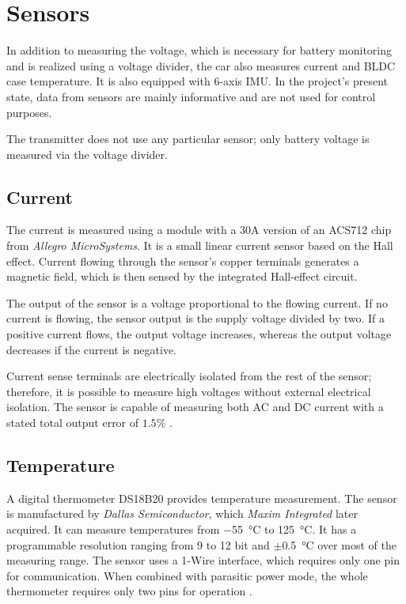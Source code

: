 \section{Sensors}
\label{hw_sensors}
In addition to measuring the voltage, which is necessary for battery monitoring and is realized using a voltage divider, the car also measures current and BLDC case temperature. It is also equipped with 6-axis IMU. In the project's present state, data from sensors are mainly informative and are not used for control purposes.

The transmitter does not use any particular sensor; only battery voltage is measured via the voltage divider.

\subsection{Current}		%
The current is measured using a module with a 30A version of an ACS712 chip from \textit{Allegro MicroSystems}. It is a small linear current sensor based on the Hall effect. Current flowing through the sensor's copper terminals generates a magnetic field, which is then sensed by the integrated Hall-effect circuit.

The output of the sensor is a voltage proportional to the flowing current. If no current is flowing, the sensor output is the supply voltage divided by two. If a positive current flows, the output voltage increases, whereas the output voltage decreases if the current is negative.

Current sense terminals are electrically isolated from the rest of the sensor; therefore, it is possible to measure high voltages without external electrical isolation. The sensor is capable of measuring both AC and DC current with a stated total output error of $1.5\%$ \cite{acs_datasheet}. 

\subsection{Temperature}	%
A digital thermometer DS18B20 provides temperature measurement. The sensor is manufactured by \textit{Dallas Semiconductor}, which \textit{Maxim Integrated} later acquired. It can measure temperatures from \SI{-55}{\degreeCelsius} to \SI{125}{\degreeCelsius}. It has a programmable resolution ranging from 9 to 12 bit and $\pm$\SI{0.5}{\degreeCelsius} over most of the measuring range. The sensor uses a 1-Wire interface, which requires only one pin for communication. When combined with parasitic power mode, the whole thermometer requires only two pins for operation \cite{ds_datasheet}.

